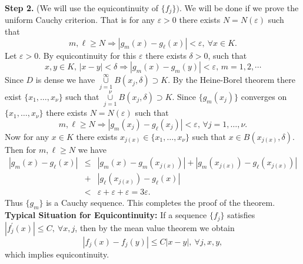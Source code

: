 \documentclass[12pt]{report}
\begin{document}
\vspace{2mm}
\noindent
{\bf Step 2.} (We will use the equicontinuity of $\{f_j\}).$  We will
be done if we prove the uniform Cauchy criterion. That is  for any
$\varepsilon > 0$ there exists $N = N(\varepsilon)$ such that 
\[
m,\ell \ge N
\Longrightarrow |g_m(x) - g_\ell(x)| < \varepsilon, \
\forall x \in K.
\]
\noindent
Let $\varepsilon > 0$.  By equicontinuity for this $\varepsilon $
there exists $\delta > 0$, such that
\[ x, y\in K,\,
 |x-y| < \delta \Longrightarrow |g_m(x) - g_m(y)| <
\varepsilon,\,  m=1,2,\cdots 
\]
 Since $D$ is dense  we have
$\overset{\infty}{\underset{j=1}{\cup}} B(x_j, \delta) \supset K$.
  By the Heine-Borel theorem there exist 
 $\{x_1, \dots, x_\nu\}$ 
such that
$\overset{\nu}{\underset{j=1}{\cup}}  B(x_j, \delta) \supset K$.
Since
 $\{g_m(x_j)\}$ converges on  $\{x_1, \dots, x_\nu\}$
there exists $N=N(\varepsilon)$ such that
 \[
m, \ell \ge N \Longrightarrow |g_m(x_j) - g_\ell (x_j)| <
\varepsilon,\, \forall j =1,\dots, \nu.
\]
Now for any $x \in K$ there exists $x_{j(x)}\in
\{x_1, \dots, x_\nu\}$ such that 
$x\in B(x_{j(x)}, \delta)$.  Then for  $m, \ell \ge N$ we have
\begin{eqnarray*}
|g_m(x) - g_\ell(x)| &\le& |g_m(x) - g_m(x_{j(x)})| + |g_m(x_{j(x)})
- g_\ell (x_{j(x)})|\\ &+& |g_\ell (x_{j(x)}) - g_\ell(x)|\\
&<& \varepsilon + \varepsilon + \varepsilon = 3 \varepsilon.
\end{eqnarray*}
Thus $\{g_m\}$ is a Cauchy sequence. This completes the proof
of the theorem.
\noindent
{\bf Typical Situation for Equicontinuity:}
If a sequence $\{f_j\}$ satisfies $|f^\prime_j(x)| \le C, \ \forall x,
j$,  then by the mean value theorem we obtain
\[
|f_j(x) - f_j(y)| \le C|x-y|, \ \forall j, x, y,
\]
which implies equicontinuity.
\end{document}
